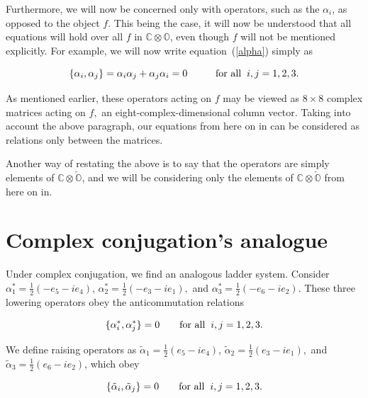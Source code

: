 \documentclass[letterpaper,12pt,titlepage,oneside,final]{book}
\newcommand{\CO}{\mathbb{C}\otimes\mathbb{O}}
\newcommand{\COOO}{\mathbb{C}\otimes\overleftarrow{\mathbb{O}}}
\begin{document}
Furthermore,  we will now be concerned only with operators, such as the $\alpha_i$, as opposed to the object $f$.  This being the case, it will now be understood that all equations will hold over all $f$ in $\CO$, even though $f$ will not be mentioned explicitly.    For example, we will now write equation~(\ref{alpha}) simply as

\begin{equation}
\{\alpha_i, \alpha_j\} =\alpha_i\alpha_j+\alpha_j \alpha_i = 0 \hspace{1cm}\textup{for all}\hspace{0.2cm} i,j = 1,2,3.
\end{equation}

As mentioned earlier, these operators acting on $f$ may be viewed as $8\times8$ complex matrices acting on $f,$ an eight-complex-dimensional column vector.  Taking into account the above paragraph, our equations from here on in can be considered as relations only between the matrices.

Another way of restating the above is to say that the operators are simply elements of $\COOO$, and we will be considering only the elements of $\COOO$ from here on in.



\section{Complex conjugation's analogue\label{conj}  }

Under complex conjugation, we find an analogous ladder system.  Consider $\alpha_1^* = \frac{1}{2}\left(-e_5-ie_4\right)$,  $\alpha_2^* = \frac{1}{2}\left(-e_3-ie_1\right),$ and $\alpha_3^* = \frac{1}{2}\left(-e_6-ie_2\right)$.  These three lowering operators obey the anticommutation relations

\begin{equation}
\{\alpha_i^*, \alpha_j^*\} = 0 \hspace{0.7cm}\textup{for all}\hspace{0.2cm} i,j = 1,2,3.
\end{equation}



We define raising operators as $\tilde{\alpha}_1 = \frac{1}{2}\left(e_5-ie_4\right)$,  $\tilde{\alpha}_2 = \frac{1}{2}\left(e_3-ie_1\right),$ and $\tilde{\alpha}_3 = \frac{1}{2}\left(e_6-ie_2\right)$, which obey

\begin{equation}
\{\tilde{\alpha}_i, \tilde{\alpha}_j\} = 0 \hspace{0.7cm}\textup{for all} \hspace{0.2cm} i,j = 1,2,3.
\end{equation}
\end{document}
